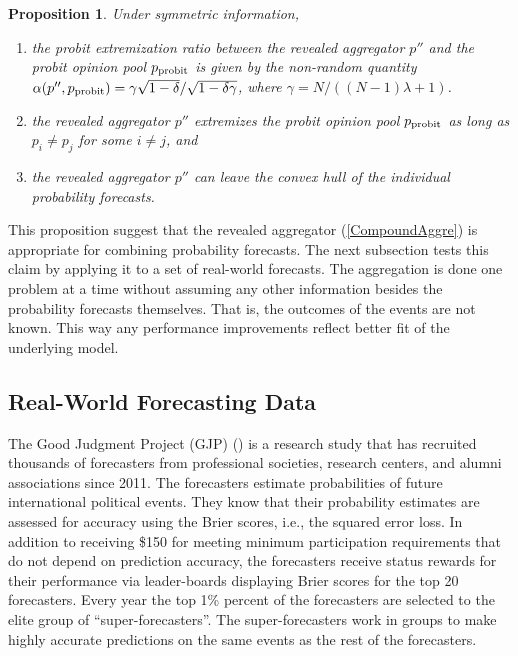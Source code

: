\documentclass[12pt]{article}
\newtheorem{proposition}[theorem]{Proposition}
\theoremstyle{definition}
\theoremstyle{definition}
\def\probit{p_{\rm probit}}
\begin{document}
\begin{proposition} \label{positiveThm}
Under symmetric information, 
\begin{enumerate}
\item[$(i)$] the probit extremization ratio between the revealed
aggregator $p''$ and the probit opinion pool $\probit$ is given by the
non-random quantity $\alpha(p'', \probit) =  \gamma \sqrt{1 - \delta}/\sqrt{1-\delta\gamma}$, where $\gamma = N/((N-1)\lambda +1)$.
\item[$(ii)$] the revealed aggregator $p''$ extremizes the probit
opinion pool $\probit$ as long as $p_i \neq p_j$ for some $i \neq j$,
and
\item[$(iii)$] the revealed aggregator $p''$ can leave the convex hull
of the individual probability forecasts.
\end{enumerate}
\end{proposition}
This proposition suggest that the revealed aggregator
(\ref{CompoundAggre}) is appropriate for combining probability
forecasts. The next subsection tests this claim by applying it to a set
of real-world forecasts. The aggregation is done one problem at a time
without assuming any other information besides the probability
forecasts themselves. That is, the outcomes of the events are not
known. This way any performance improvements reflect better fit of the
underlying model.



\subsection{Real-World Forecasting Data}
\label{realData}
The Good Judgment Project (GJP) (\citealt{mellers2014psychological,
ungar2012good}) is a research study that has recruited
thousands of forecasters from professional societies, research
centers, and alumni associations since 2011.  The forecasters estimate
probabilities of future international political events.  They know that their
probability estimates are assessed for accuracy using the Brier scores, i.e., the
squared error loss.  In addition to receiving \$150 for
meeting minimum participation requirements that do not depend on
prediction accuracy, the forecasters receive status rewards for their
performance via leader-boards displaying Brier scores for the top 20
forecasters.  Every year the top 1\% percent of the forecasters are
selected to the elite group of ``super-forecasters''. The
super-forecasters work in groups to make highly accurate predictions
on the same events as the rest of the forecasters.
\end{document}
